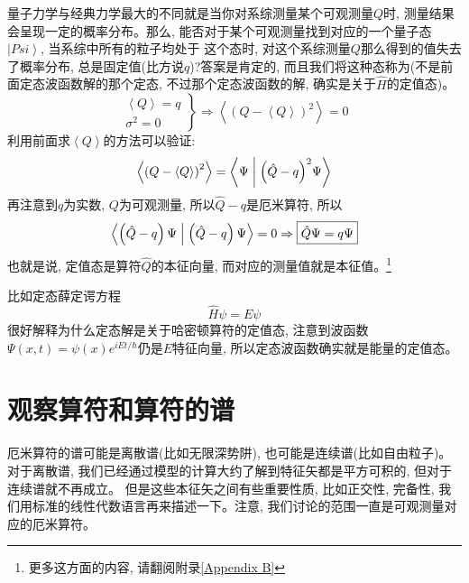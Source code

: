 \documentclass[a4paper,zihao=-4,linespread=1]{ctexrep}
\begin{document}
    量子力学与经典力学最大的不同就是当你对系综测量某个可观测量$Q$时, 测量结果会呈现一定的概率分布。那么, 能否对于某个可观测量找到对应的一个量子态$\left|Psi\right\rangle$, 当系综中所有的粒子均处于
    这个态时, 对这个系综测量$Q$那么得到的值失去了概率分布, 总是固定值(比方说$q$)?答案是肯定的, 而且我们将这种态称为(不是前面定态波函数解的那个定态, 不过那个定态波函数的解, 确实是关于$\hat{H}$的定值态)。
    \begin{equation*}
        \left.\begin{matrix} 
            \left \langle Q \right \rangle=q \\ 
            \sigma^2=0
          \end{matrix}\right\}\Rightarrow \left \langle \left( Q-\left \langle Q \right \rangle  \right )^2\right \rangle  =0
    \end{equation*}
    利用前面求$\left\langle Q \right\rangle$的方法可以验证:
    \[\left \langle \left( Q-\left \langle Q \right \rangle  \right )^2\right \rangle =\left\langle {\Psi }
    \mathrel{\left | {\vphantom {\Psi  {{{\left( {\hat Q - q} \right)}^2}\Psi }}}
    \right. \kern-\nulldelimiterspace}
    {{{{\left( {\hat Q - q} \right)}^2}\Psi }} \right\rangle \]
    再注意到$q$为实数, $Q$为可观测量, 所以$\hat{Q}-q$是厄米算符, 所以
    \[\left\langle {{\left( {\hat Q - q} \right)\Psi }}
    \mathrel{\left | {\vphantom {{\left( {\hat Q - q} \right)\Psi } {\left( {\hat Q - q} \right)\Psi }}}
    \right. \kern-\nulldelimiterspace}
    {{\left( {\hat Q - q} \right)\Psi }} \right\rangle =0\Rightarrow
    \boxed{\hat{Q}\Psi=q\Psi}\]
    也就是说, 定值态是算符$\hat{Q}$的本征向量, 而对应的测量值就是本征值。\footnote[1]{更多这方面的内容, 请翻阅附录\ref{Appendix B}}

    比如定态薛定谔方程$$\hat{H}\psi=E\psi$$
    很好解释为什么定态解是关于哈密顿算符的定值态, 注意到波函数$\Psi(x,t)=\psi(x)e^{iEt/\hbar}$仍是$E$特征向量, 所以定态波函数确实就是能量的定值态。
    \section{观察算符和算符的谱}
    厄米算符的谱可能是离散谱(比如无限深势阱), 也可能是连续谱(比如自由粒子)。对于离散谱, 我们已经通过模型的计算大约了解到特征矢都是平方可积的, 但对于连续谱就不再成立。
    但是这些本征矢之间有些重要性质, 比如正交性, 完备性, 我们用标准的线性代数语言再来描述一下。注意, 我们讨论的范围一直是可观测量对应的厄米算符。
\end{document}
